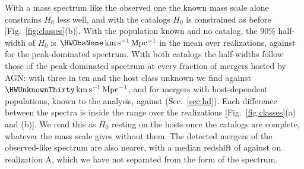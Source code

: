 \documentclass[aps,prd,reprint,twocolumn,superscriptaddress,nofootinbib,floatfix,nolongbibliography]{revtex4-2}
\newcommand{\kms}{{\rm km\,s^{-1}\,Mpc^{-1}}}
\begin{document}
With a mass spectrum like the observed one the known mass scale alone
constrains $H_0$ less well, and with the catalogs $H_0$ is constrained as
before [Fig.~\ref{fig:classes}(b)]. With the population known and no
catalog, the 90\% half-width of $H_0$ is $\HWObsNone\,\kms$ in the mean over
\NrealClasses{} realizations, against \HWNone{} for the peak-dominated
spectrum. With both catalogs the half-widths follow those of the
peak-dominated spectrum at every fraction of mergers hosted by AGN: with
three in ten and the host class unknown we find \HWObsUnknownThirty{}
against $\HWUnknownThirty\,\kms$, and for mergers with host-dependent
populations, known to the analysis, \HWObsPopsThirty{} against \HWPopsThirty{}
(Sec.~\ref{sec:hd}). Each difference between the spectra is inside the range
over the realizations [Fig.~\ref{fig:classes}(a) and (b)]. We read this as
$H_0$ resting on the hosts once the catalogs are complete, whatever the mass
scale gives without them. The detected
mergers of the observed-like spectrum are also nearer, with a median
redshift of \ObsDetzMedian{} against \MockzMedian{} on realization A, which
we have not separated from the form of the spectrum.
\end{document}
